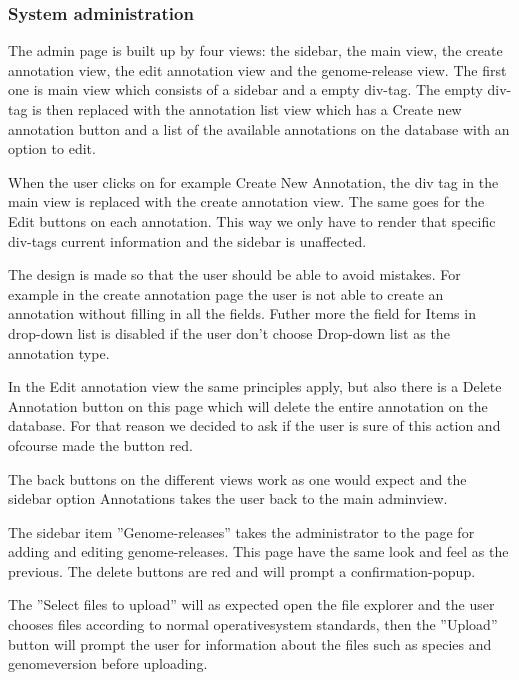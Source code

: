 \subsubsection{System administration}
The admin page is built up by four views: the sidebar, the main view, the create annotation view, the edit annotation view and the genome-release view. The first one is main view which consists of a sidebar and a empty div-tag. 
The empty div-tag is then replaced with the annotation list view which has a Create new annotation button 
and a list of the available annotations on the database with an option to edit. 

When the user clicks on for example Create New Annotation, the div tag in the main view is replaced with the create annotation view.
The same goes for the Edit buttons on each annotation. This way we only have to render that specific div-tags current information 
and the sidebar is unaffected. 

The design is made so that the user should be able to avoid mistakes. For example in the 
create annotation page the user is not able to create an annotation without filling in all the fields. Futher more the 
field for Items in drop-down list is disabled if the user don't choose Drop-down list as the annotation type. 

In the Edit annotation view the same principles apply, but also there is a Delete Annotation button on this page which will
delete the entire annotation on the database.
For that reason we decided to ask if the user is sure of this action and ofcourse made the button red.

The back buttons on the different views work as one would expect and the sidebar option Annotations takes the user back to the main adminview.

The sidebar item ''Genome-releases'' takes the administrator to the page for adding and editing genome-releases. This page have the same look and feel as the previous. The delete buttons are red and will prompt a confirmation-popup. 

The ''Select files to upload'' will as expected open the file explorer and the user chooses files according to normal operativesystem standards, then the ''Upload'' button will prompt the user for information about the files such as species and genomeversion before uploading. 
